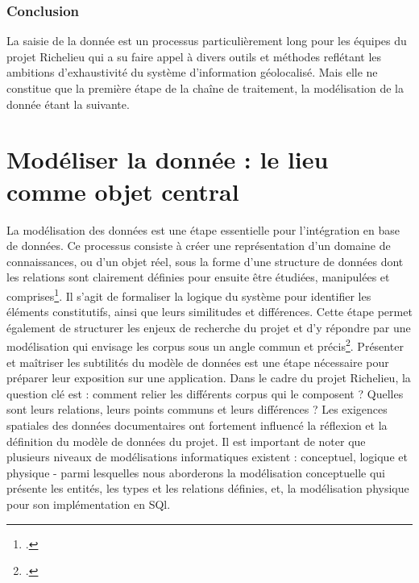 
\subsubsection{Conclusion}
La saisie de la donnée est un processus particulièrement long pour les équipes du projet Richelieu qui a su faire appel à divers outils et méthodes reflétant les ambitions d'exhaustivité du système d'information géolocalisé. Mais elle ne constitue que la première étape de la chaîne de traitement, la modélisation de la donnée étant la suivante.

\section{Modéliser la donnée : le lieu comme objet central}
La modélisation des données est une étape essentielle pour l'intégration en base de données. Ce processus consiste à créer une représentation d'un domaine de connaissances, ou d'un objet réel, sous la forme d'une structure de données dont les relations sont clairement définies pour ensuite être étudiées, manipulées et comprises\footcite{FLANDERSShape2018}. Il s'agit de formaliser la logique du système pour identifier les éléments constitutifs, ainsi que leurs similitudes et différences. Cette étape permet également de structurer les enjeux de recherche du projet et d'y répondre par une modélisation qui envisage les corpus sous un angle commun et précis\footcite{SOUTOUModelisation2017}. Présenter et maîtriser les subtilités du modèle de données est une étape nécessaire pour préparer leur exposition sur une application. Dans le cadre du projet Richelieu, la question clé est : comment relier les différents corpus qui le composent ? Quelles sont leurs relations, leurs points communs et leurs différences ? Les exigences spatiales des données documentaires ont fortement influencé la réflexion et la définition du modèle de données du projet. Il est important de noter que plusieurs niveaux de modélisations informatiques existent : conceptuel, logique et physique - parmi lesquelles nous aborderons la modélisation conceptuelle qui présente les entités, les types et les relations définies, et, la modélisation physique pour son implémentation en SQl. 

